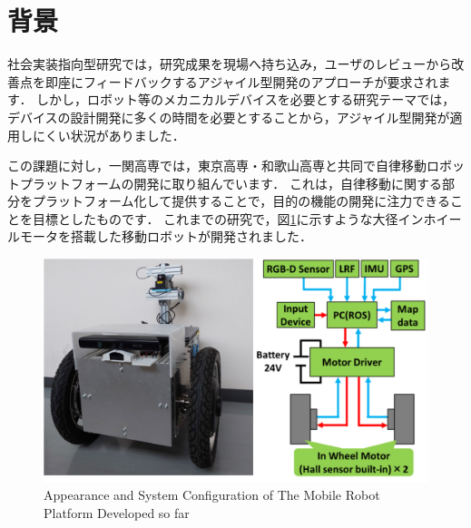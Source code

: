 \documentclass[{../../master}]{subfiles}
\begin{document}
\section{背景}

社会実装指向型研究では，研究成果を現場へ持ち込み，ユーザのレビューから改善点を即座にフィードバックするアジャイル型開発のアプローチが要求されます．
しかし，ロボット等のメカニカルデバイスを必要とする研究テーマでは，デバイスの設計開発に多くの時間を必要とすることから，アジャイル型開発が適用しにくい状況がありました．

この課題に対し，一関高専では，東京高専・和歌山高専と共同で自律移動ロボットプラットフォームの開発に取り組んでいます．
これは，自律移動に関する部分をプラットフォーム化して提供することで，目的の機能の開発に注力できることを目標としたものです．
これまでの研究で，図\ref{fig:previous_work}に示すような大径インホイールモータを搭載した移動ロボットが開発されました．

\begin{figure}[h]
  \centering
  \includegraphics[width=80truemm, clip]{images/previous_work.pdf}
  \caption{Appearance and System Configuration of The Mobile Robot Platform Developed so far}
  \label{fig:previous_work}
\end{figure}
\end{document}
